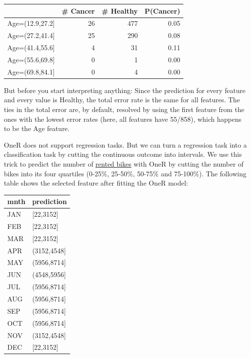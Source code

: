 \documentclass[
  11pt,
]{scrbook}
\begin{document}
\begin{table}
\centering
\begin{tabular}{lrrr}
\toprule
  & \# Cancer & \# Healthy & P(Cancer)\\
\midrule
Age=(12.9,27.2] & 26 & 477 & 0.05\\
Age=(27.2,41.4] & 25 & 290 & 0.08\\
Age=(41.4,55.6] & 4 & 31 & 0.11\\
Age=(55.6,69.8] & 0 & 1 & 0.00\\
Age=(69.8,84.1] & 0 & 4 & 0.00\\
\bottomrule
\end{tabular}
\end{table}

But before you start interpreting anything:
Since the prediction for every feature and every value is Healthy, the total error rate is the same for all features.
The ties in the total error are, by default, resolved by using the first feature from the ones with the lowest error rates (here, all features have 55/858), which happens to be the Age feature.

OneR does not support regression tasks.
But we can turn a regression task into a classification task by cutting the continuous outcome into intervals.
We use this trick to predict the number of \protect\hyperlink{bike-data}{rented bikes} with OneR by cutting the number of bikes into its four quartiles (0-25\%, 25-50\%, 50-75\% and 75-100\%).
The following table shows the selected feature after fitting the OneR model:

\begin{table}
\centering
\begin{tabular}{ll}
\toprule
mnth & prediction\\
\midrule
JAN & {}[22,3152]\\
FEB & {}[22,3152]\\
MAR & {}[22,3152]\\
APR & (3152,4548]\\
MAY & (5956,8714]\\
\addlinespace
JUN & (4548,5956]\\
JUL & (5956,8714]\\
AUG & (5956,8714]\\
SEP & (5956,8714]\\
OCT & (5956,8714]\\
\addlinespace
NOV & (3152,4548]\\
DEC & {}[22,3152]\\
\bottomrule
\end{tabular}
\end{table}
\end{document}
